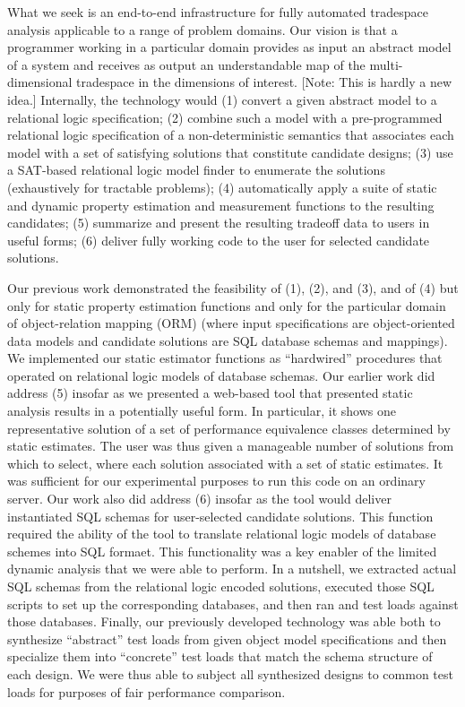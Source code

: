 What we seek is an end-to-end infrastructure for fully automated tradespace analysis applicable to a range of problem domains. Our vision is that a programmer working in a particular domain provides as input an abstract model of a system and receives as output an understandable map of the multi-dimensional tradespace in the dimensions of interest. [Note: This is hardly a new idea.] Internally, the technology would (1) convert a given abstract model to a relational logic specification; (2) combine such a model with a pre-programmed relational logic specification of a non-deterministic semantics that associates each model with a set of satisfying solutions that constitute candidate designs; (3) use a SAT-based relational logic model finder to enumerate the solutions (exhaustively for tractable problems); (4) automatically apply a suite of static and dynamic property estimation and measurement functions to the resulting candidates; (5) summarize and present the resulting tradeoff data to users in useful forms; (6) deliver fully working code to the user for selected candidate solutions.

Our previous work demonstrated the feasibility of (1), (2), and (3), and of (4) but only for static property estimation functions and only for the particular domain of object-relation mapping (ORM) (where input specifications are object-oriented data models and candidate solutions are SQL database schemas and mappings). We implemented our static estimator functions as ``hardwired'' procedures that operated on relational logic models of database schemas. Our earlier work did address (5) insofar as we presented a web-based tool that presented static analysis results in a potentially useful form. In particular, it shows one representative solution of a set of performance equivalence classes determined by static estimates. The user was thus given a manageable number of solutions from which to select, where each solution associated with a set of static estimates. It was sufficient for our experimental purposes to run this code on an ordinary server. Our work also did address (6) insofar as the tool would deliver instantiated SQL schemas for user-selected candidate solutions. This function required the ability of the tool to translate relational logic models of database schemes into SQL formaet. This functionality was a key enabler of the limited dynamic analysis that we were able to perform. In a nutshell, we extracted actual SQL schemas from the relational logic encoded solutions, executed those SQL scripts to set up the corresponding databases, and then ran and test loads against those databases. Finally, our previously developed technology was able both to synthesize ``abstract'' test loads from given object model specifications and then specialize them into ``concrete'' test loads that match the schema structure of each design. We were thus able to subject all synthesized designs to common test loads for purposes of fair performance comparison.

